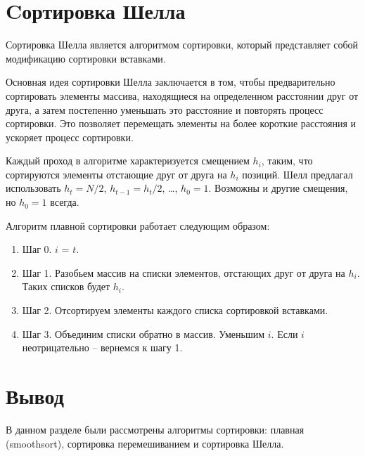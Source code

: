 \section{Cортировка Шелла}

Сортировка Шелла является алгоритмом сортировки, который представляет собой модификацию сортировки вставками.


Основная идея сортировки Шелла заключается в том, чтобы предварительно сортировать элементы массива, находящиеся на определенном расстоянии друг от друга, а затем постепенно уменьшать это расстояние и повторять процесс сортировки. Это позволяет перемещать элементы на более короткие расстояния и ускоряет процесс сортировки.


Каждый проход в алгоритме характеризуется смещением $h_{i}$, таким, что сортируются элементы отстающие друг от друга на $h_{i}$ позиций. Шелл предлагал использовать $h_{t}=N/2$, $h_{t-1}=h_{t}/2$, …, $h_0=1$. Возможны и другие смещения, но $h_0=1$
всегда.


Алгоритм плавной сортировки работает следующим образом:
\begin{enumerate}
	\item Шаг 0. $i$ = $t$.
	\item Шаг 1. Разобьем массив на списки элементов, отстающих друг от друга на $h_{i}$. Таких списков будет $h_{i}$.
	\item Шаг 2. Отсортируем элементы каждого списка сортировкой вставками.
	\item Шаг 3. Объединим списки обратно в массив. Уменьшим $i$. Если $i$ неотрицательно -- вернемся к шагу 1.
\end{enumerate}

\section*{Вывод}

В данном разделе были рассмотрены алгоритмы сортировки: плавная (smoothsort), сортировка перемешиванием и сортировка Шелла.